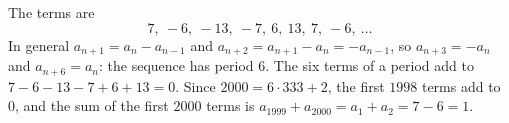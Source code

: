 The terms are
\[7,\ -6,\ -13,\ -7,\ 6,\ 13,\ 7,\ -6,\ \dots\]
In general $a_{n+1}=a_n-a_{n-1}$ and $a_{n+2}=a_{n+1}-a_n=-a_{n-1}$, so $a_{n+3}=-a_n$ and $a_{n+6}=a_n$: the sequence has period $6$. The six terms of a period add to $7-6-13-7+6+13=0$. Since $2000=6\cdot333+2$, the first $1998$ terms add to $0$, and the sum of the first $2000$ terms is $a_{1999}+a_{2000}=a_1+a_2=7-6=\boxed{1}$.
